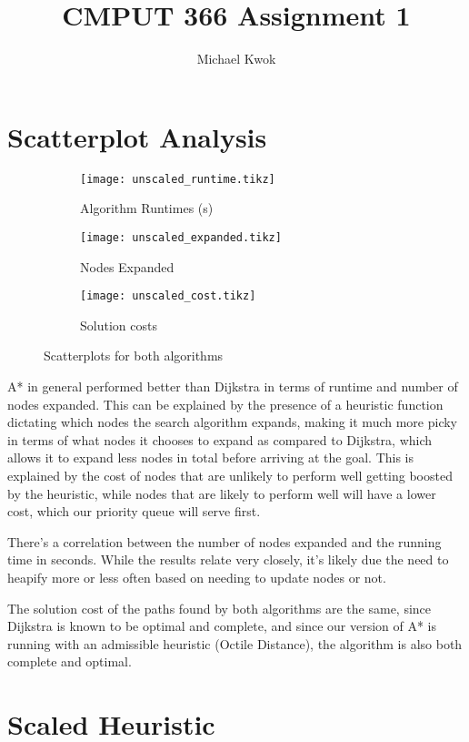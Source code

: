\documentclass{article}
\title{CMPUT 366 Assignment 1}
\author{Michael Kwok}
\begin{document}
\maketitle
\section*{Scatterplot Analysis}

\begin{figure}[h]
  \centering
  \begin{subfigure}[c]{0.3\textwidth}
    \texttt{[image: unscaled\_runtime.tikz]}
    \caption{Algorithm Runtimes (s)}
  \end{subfigure}
  \begin{subfigure}[c]{0.3\textwidth}
    \texttt{[image: unscaled\_expanded.tikz]}
    \caption{Nodes Expanded}
  \end{subfigure}
  \begin{subfigure}[c]{0.3\textwidth}
    \texttt{[image: unscaled\_cost.tikz]}
    \caption{Solution costs}
  \end{subfigure}
  \caption{Scatterplots for both algorithms}
\end{figure}

A* in general performed better than Dijkstra in terms of runtime and number of nodes expanded. This can be explained by the presence of a heuristic function dictating which nodes the search algorithm expands, making it much more picky in terms of what nodes it chooses to expand as compared to Dijkstra, which allows it to expand less nodes in total before arriving at the goal. This is explained by the cost of nodes that are unlikely to perform well getting boosted by the heuristic, while nodes that are likely to perform well will have a lower cost, which our priority queue will serve first.

There's a correlation between the number of nodes expanded and the running time in seconds. While the results relate very closely, it's likely due the need to heapify more or less often based on needing to update nodes or not.

The solution cost of the paths found by both algorithms are the same, since Dijkstra is known to be optimal and complete, and since our version of A* is running with an admissible heuristic (Octile Distance), the algorithm is also both complete and optimal.
\newpage
\section*{Scaled Heuristic}
\end{document}
